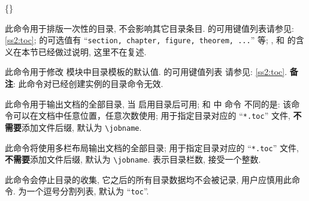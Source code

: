 \begin{function}[added=2025-09-08]{\ztoclineOnce}
  \begin{syntax}
    \{\}
  \end{syntax}
  此命令用于排版一次性的目录, 不会影响其它目录条目.  的可用键值列表请参见: \cref{ss2:toc};
   的可选值有 ``\texttt{section, chapter, figure, theorem, ...}'' 等; , 
  和  的含义在本节已经做过说明, 这里不在复述.
\end{function}


\begin{function}[added=2025-09-08]{\ztocTemplateDefaultsEdit}
  \begin{syntax}
  \end{syntax}
  此命令用于修改  模块中目录模板的默认值.  的可用键值列表
  请参见: \cref{ss2:toc}. \textbf{备注}: 此命令对已经创建实例的目录命令无效.
\end{function}


\begin{function}[updated=2025-07-06]{\tableofcontents}
  \begin{syntax}
  \end{syntax}
  此命令用于输出文档的全部目录, 当  启用目录后可用; 和  中  命令
  不同的是: 该命令可以在文档中任意位置，任意次数使用;  用于指定目录对应的 ``\texttt{*.toc}'' 文件,
  \textbf{不需要}添加文件后缀, 默认为 \verb|\jobname|.
\end{function}


\begin{function}[updated=2025-07-06]{\multicolcontents}
  \begin{syntax}
  \end{syntax}
  此命令将使用多栏布局输出文档的全部目录;  用于指定目录对应的 ``\texttt{*.toc}'' 文件,
  \textbf{不需要}添加文件后缀, 默认为 \verb|\jobname|.  表示目录栏数, 接受一个整数.
\end{function}


\begin{function}[added=2025-09-04]{\ztocstop}
  \begin{syntax}
  \end{syntax}
  此命令会停止目录的收集, 它之后的所有目录数据均不会被记录, 用户应慎用此命令.
   为一个逗号分割列表, 默认为 ``\texttt{toc}''.
\end{function}


